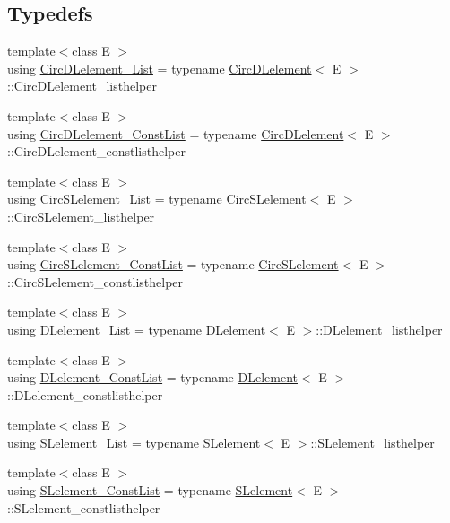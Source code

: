 \subsection*{Typedefs}
\begin{DoxyCompactItemize}
\item 
{\footnotesize template$<$class E $>$ }\\using \hyperlink{namespacebridges_1_1datastructure_ab12c4e35f7131413ee6a5759273d94ac}{Circ\+D\+Lelement\+\_\+\+List} = typename \hyperlink{classbridges_1_1datastructure_1_1_circ_d_lelement}{Circ\+D\+Lelement}$<$ E $>$\+::Circ\+D\+Lelement\+\_\+listhelper
\item 
{\footnotesize template$<$class E $>$ }\\using \hyperlink{namespacebridges_1_1datastructure_a72ff4f4c6720d9c7f9fb29141cc341c1}{Circ\+D\+Lelement\+\_\+\+Const\+List} = typename \hyperlink{classbridges_1_1datastructure_1_1_circ_d_lelement}{Circ\+D\+Lelement}$<$ E $>$\+::Circ\+D\+Lelement\+\_\+constlisthelper
\item 
{\footnotesize template$<$class E $>$ }\\using \hyperlink{namespacebridges_1_1datastructure_a0369e2cdb6565569ce7fe329c66d1faf}{Circ\+S\+Lelement\+\_\+\+List} = typename \hyperlink{classbridges_1_1datastructure_1_1_circ_s_lelement}{Circ\+S\+Lelement}$<$ E $>$\+::Circ\+S\+Lelement\+\_\+listhelper
\item 
{\footnotesize template$<$class E $>$ }\\using \hyperlink{namespacebridges_1_1datastructure_a607154461f3493b40cb0c0b6217d97cb}{Circ\+S\+Lelement\+\_\+\+Const\+List} = typename \hyperlink{classbridges_1_1datastructure_1_1_circ_s_lelement}{Circ\+S\+Lelement}$<$ E $>$\+::Circ\+S\+Lelement\+\_\+constlisthelper
\item 
{\footnotesize template$<$class E $>$ }\\using \hyperlink{namespacebridges_1_1datastructure_a3bc755a675bce8fd5e0fefd10bb72977}{D\+Lelement\+\_\+\+List} = typename \hyperlink{classbridges_1_1datastructure_1_1_d_lelement}{D\+Lelement}$<$ E $>$\+::D\+Lelement\+\_\+listhelper
\item 
{\footnotesize template$<$class E $>$ }\\using \hyperlink{namespacebridges_1_1datastructure_a89a5bc532207f3279ad747ba91e75527}{D\+Lelement\+\_\+\+Const\+List} = typename \hyperlink{classbridges_1_1datastructure_1_1_d_lelement}{D\+Lelement}$<$ E $>$\+::D\+Lelement\+\_\+constlisthelper
\item 
{\footnotesize template$<$class E $>$ }\\using \hyperlink{namespacebridges_1_1datastructure_a0db8f181ce44ed3dd8b3da7184c2364a}{S\+Lelement\+\_\+\+List} = typename \hyperlink{classbridges_1_1datastructure_1_1_s_lelement}{S\+Lelement}$<$ E $>$\+::S\+Lelement\+\_\+listhelper
\item 
{\footnotesize template$<$class E $>$ }\\using \hyperlink{namespacebridges_1_1datastructure_adc1ea9eeab8d889046a192dc16743190}{S\+Lelement\+\_\+\+Const\+List} = typename \hyperlink{classbridges_1_1datastructure_1_1_s_lelement}{S\+Lelement}$<$ E $>$\+::S\+Lelement\+\_\+constlisthelper
\end{DoxyCompactItemize}
